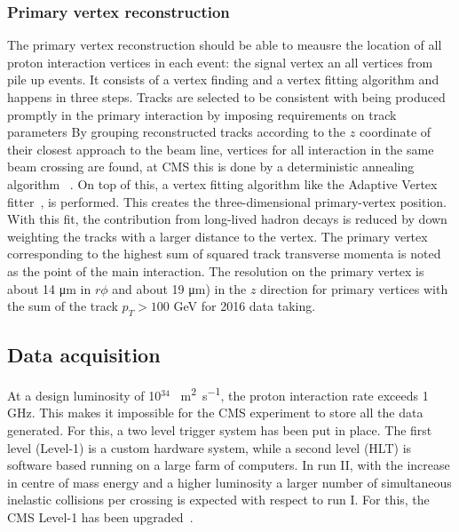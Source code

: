 \subsubsection*{Primary vertex reconstruction}
The primary vertex reconstruction should be able to meausre the location of all proton interaction vertices in each event: the signal vertex an all vertices from pile up events. 
It consists of a vertex finding and a vertex fitting algorithm and happens in three steps. Tracks are selected  to be consistent with being produced promptly in the primary interaction by imposing requirements on track parameters\cite{Chatrchyan:1704291} By grouping reconstructed tracks according to the $z$ coordinate of their closest approach to the beam line, vertices for all interaction in the same beam crossing are found, at CMS this is done by a deterministic annealing algorithm~\cite{726788} . On top of this, a vertex fitting algorithm like the Adaptive Vertex fitter~\cite{Waltenberger:1166320}, is performed. This creates the three-dimensional primary-vertex position. With this fit, the contribution from long-lived hadron decays is reduced by down weighting the tracks with a larger distance to the vertex. The primary vertex corresponding to the highest sum of squared track transverse momenta is noted as the point of the main interaction. The resolution on the primary vertex is about 14 \si{ \micro \meter} in $r\phi$ and about 19 \si{ \micro \meter}) in the $z$ direction for primary vertices with the sum of the track $p_T > 100$ \si{ \GeV} for 2016 data taking.
\subsection{Data acquisition}
At a design luminosity of 10$^{34}$ \si{ \per \square \meter \per \second}, the proton interaction rate exceeds 1 \si{ \giga \hertz}. This makes it impossible for the CMS experiment to store all the data generated. For this, a two level trigger system has been put in place. The first level (Level-1) is a custom hardware system, while a second level (HLT) is software based running on a large farm of computers. 
In run II, with the increase in centre of mass energy and a higher luminosity a larger number of simultaneous inelastic collisions per crossing is expected with respect to run I. For this, the CMS Level-1 has been upgraded~\cite{1748-0221-12-03-C03021}. 

